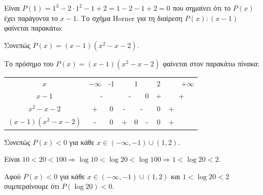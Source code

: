 \documentclass[11pt,a4paper,twoside]{book}
\begin{document}
\begin{alist}
\item Είναι $P(1) = 1^3 - 2 \cdot 1^2 - 1 + 2 = 1 - 2 - 1 + 2 = 0$ που σημαίνει ότι το $P(x)$ έχει παράγοντα το $x - 1$. Το σχήμα Horner για τη διαίρεση $P(x) : (x - 1)$ φαίνεται παρακάτω:
\begin{center}
\Horner
\end{center}
Συνεπώς $P(x) = (x - 1)(x^2 - x - 2)$.
\item Το πρόσημο του $P(x) = (x - 1)(x^2 - x - 2)$ φαίνεται στον παρακάτω πίνακα:
\begin{center}
\begin{tabular}{|c|c|c|c|c|c|c|c|c|}

$x$ & $-\infty$ & -1 & & 1 & & 2 & & $+\infty$ \\ 
$x - 1$ & \multicolumn{2}{c|}{-} & \multicolumn{2}{c|}{-} & 0 & + & \multicolumn{2}{c|}{+} \\ 
$x^2 - x - 2$ & + & 0 & - & \multicolumn{2}{c|}{-} & 0 & + \\ 
$(x - 1)(x^2 - x - 2)$ & - & 0 & + & 0 & - & 0 & + \\ 
\end{tabular}
\end{center}
Συνεπώς $P(x) < 0$ για κάθε $x \in (-\infty, -1) \cup (1, 2)$.
\item Είναι $10 < 20 < 100 \Rightarrow \log 10 < \log 20 < \log 100 \Rightarrow 1 < \log 20 < 2$.
\item Αφού $P(x) < 0$ για κάθε $x \in (-\infty, -1) \cup (1, 2)$ και $1 < \log 20 < 2$ συμπεραίνουμε ότι $P(\log 20) < 0$.
\end{alist}
\end{document}
